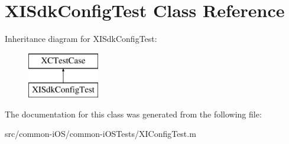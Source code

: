 \hypertarget{interface_x_i_sdk_config_test}{}\section{X\+I\+Sdk\+Config\+Test Class Reference}
\label{interface_x_i_sdk_config_test}
Inheritance diagram for X\+I\+Sdk\+Config\+Test\+:\begin{figure}[H]
\begin{center}
\leavevmode
\includegraphics[height=2.000000cm]{interface_x_i_sdk_config_test}
\end{center}
\end{figure}


The documentation for this class was generated from the following file\+:\begin{DoxyCompactItemize}
\item 
src/common-\/i\+O\+S/common-\/i\+O\+S\+Tests/X\+I\+Config\+Test.\+m\end{DoxyCompactItemize}
